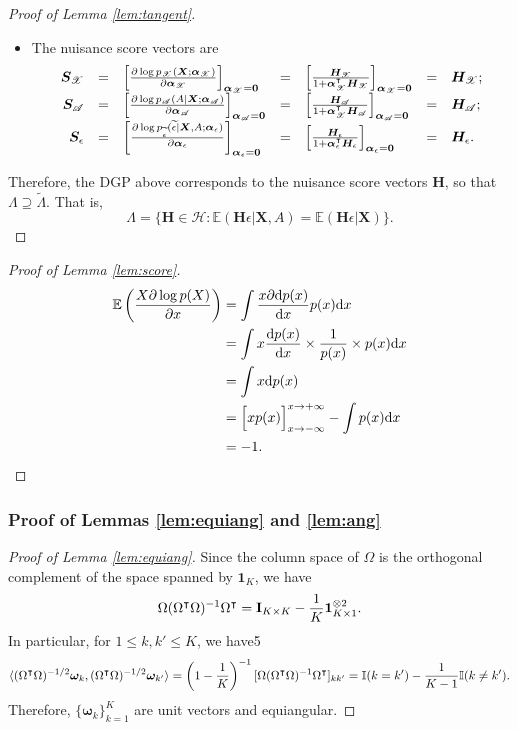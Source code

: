 \documentclass[11pt]{article}
\numberwithin{equation}{section}
\theoremstyle{definition}
\theoremstyle{remark}
\newcommand{\Ib}{\mathbf{I}}
\newcommand{\bH}{\bm{H}}
\newcommand{\bS}{\bm{S}}
\newcommand{\bX}{\bm{X}}
\newcommand{\balpha}{\bm{\alpha}}
\newcommand{\bomega}{\bm{\omega}}
\newcommand{\bbE}{\mathbb{E}}
\newcommand{\bbI}{\mathbb{I}}
\newcommand{\cH}{\mathcal{H}}
\newcommand{\sA}{\mathscr{A}}
\newcommand{\sX}{\mathscr{X}}
\newcommand{\bzero}{\mathbf{0}}	%
\newcommand{\bone}{\mathbf{1}}	%
\newcommand{\bbone}{\bbI}	%
\newcommand{\rd}{\mathrm{d}}
\begin{document}
\begin{proof}[Proof of Lemma \ref{lem:tangent}]
\begin{itemize}
		\item The nuisance score vectors are
		\[ \begin{array}{rclclcl}
			\bS_{\sX} &=& \left[ {\partial \log p_{\sX}(\bX;\balpha_{\sX}) \over \partial \balpha_{\sX}} \right]_{\balpha_{\sX} = \bzero} &=& \left[ {\bH_{\sX} \over 1 + \balpha_{\sX}^{\intercal}\bH_{\sX}} \right]_{\balpha_{\sX} = \bzero} &=& \bH_{\sX};\\
			\bS_{\sA} &=& \left[ {\partial \log p_{\sA}(A|\bX;\balpha_{\sA}) \over \partial \balpha_{\sA}} \right]_{\balpha_{\sA} = \bzero} &=& \left[ {\bH_{\sA} \over 1 + \balpha_{\sX}^{\intercal}\bH_{\sA}} \right]_{\balpha_{\sA} = \bzero} &=& \bH_{\sA};\\
			\bS_{\epsilon} &=& \left[ {\partial \log p_{\widetilde{\epsilon}}(\widetilde{\epsilon}|\bX,A;\balpha_{\epsilon}) \over \partial \balpha_{\epsilon}} \right]_{\balpha_{\epsilon} = \bzero} &=& \left[ {\bH_{\epsilon} \over 1 + \balpha_{\epsilon}^{\intercal}\bH_{\epsilon}} \right]_{\balpha_{\epsilon} = \bzero} &=& \bH_{\epsilon}.
		\end{array} \]
	\end{itemize}
	Therefore, the DGP above corresponds to the nuisance score vectors $ \bH $, so that $ \Lambda \supseteq \widetilde{\Lambda} $. That is,
	\[ \Lambda = \Big\{ \bH \in \cH: \bbE(\bH\epsilon|\bX,A) = \bbE(\bH\epsilon|\bX)\Big\}. \]
\end{proof}

\begin{proof}[Proof of Lemma \ref{lem:score}]
	\begin{align*}
		\bbE\left( {X \partial \log p(X) \over \partial x} \right) &= \int {x \partial \rd p(x) \over 
			\rd x}p(x)\rd x \\
		&= \int x {\rd p(x) \over \rd x} \times {1 \over p(x)} \times p(x) \rd x\\
		&= \int x \rd p(x)\\
		&= \Big[ xp(x) \Big]_{x \to -\infty}^{x \to +\infty} - \int p(x)\rd x\\
		&= -1.
	\end{align*}
\end{proof}

\subsubsection{Proof of Lemmas \ref{lem:equiang} and \ref{lem:ang}}

\begin{proof}[Proof of Lemma \ref{lem:equiang}]
	Since the column space of $ \Omega $ is the orthogonal complement of the space spanned by $ \bone_{K} $, we have
	\[ \Omega(\Omega^{\intercal}\Omega)^{-1}\Omega^{\intercal} = \Ib_{K\times K} - {1 \over K}\bone_{K\times 1}^{\otimes 2}. \]
	In particular, for $ 1 \le k,k'\le K $, we have5
	\[ \langle  (\Omega^{\intercal}\Omega)^{-1/2}\bomega_{k},(\Omega^{\intercal}\Omega)^{-1/2}\bomega_{k'}  \rangle = \left(1-{1 \over K}\right)^{-1} [\Omega(\Omega^{\intercal}\Omega)^{-1}\Omega^{\intercal}]_{kk'} =  \bbone(k = k') - {1 \over K-1}\bbone(k \ne k'). \]
	Therefore, $ \{ \bomega_{k} \}_{k=1}^{K} $ are unit vectors and equiangular.
\end{proof}
\end{document}
